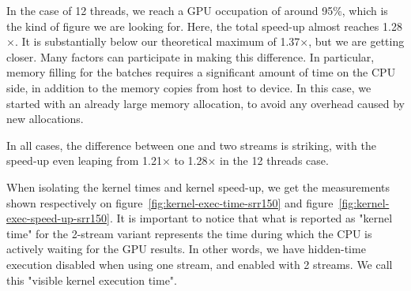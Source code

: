 In the case of 12 threads, we reach a GPU occupation of around 95\%, which is the kind of figure we are looking for. Here, the total speed-up almost reaches 1.28$\times$. It is substantially below our theoretical maximum of 1.37$\times$, but we are getting closer. Many factors can participate in making this difference. In particular, memory filling for the batches requires a significant amount of time on the CPU side, in addition to the memory copies from host to device. In this case, we started with an already large memory allocation, to avoid any overhead caused by new allocations.

In all cases, the difference between one and two streams is striking, with the speed-up even leaping from 1.21$\times$ to 1.28$\times$ in the 12 threads case.

When isolating the kernel times and kernel speed-up, we get the measurements shown respectively on figure~\ref{fig:kernel-exec-time-srr150} and figure~\ref{fig:kernel-exec-speed-up-srr150}. It is important to notice that what is reported as "kernel time" for the 2-stream variant represents the time during which the CPU is actively waiting for the GPU results. In other words, we have hidden-time execution disabled when using one stream, and enabled with 2 streams. We call this "visible kernel execution time".


